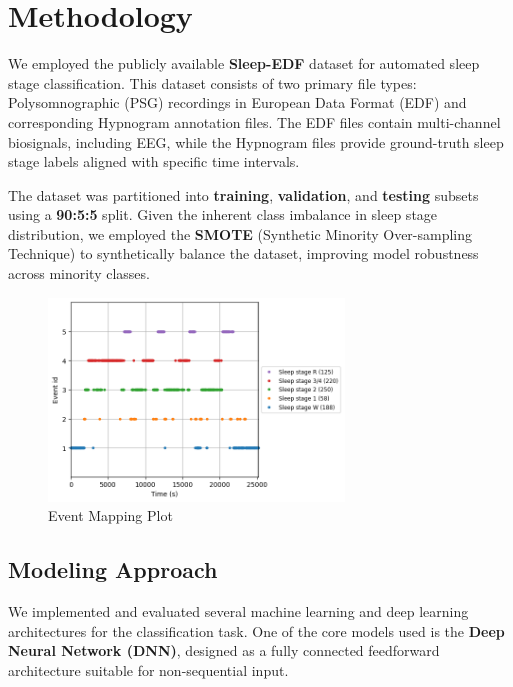 
\section{Methodology}



We employed the publicly available \textbf{Sleep-EDF} dataset for automated sleep stage classification. This dataset consists of two primary file types: Polysomnographic (PSG) recordings in European Data Format (EDF) and corresponding Hypnogram annotation files. The EDF files contain multi-channel biosignals, including EEG, while the Hypnogram files provide ground-truth sleep stage labels aligned with specific time intervals.



The dataset was partitioned into \textbf{training}, \textbf{validation}, and \textbf{testing} subsets using a \textbf{90:5:5} split. Given the inherent class imbalance in sleep stage distribution, we employed the \textbf{SMOTE} (Synthetic Minority Over-sampling Technique) to synthetically balance the dataset, improving model robustness across minority classes.


\begin{figure}[H]
	\centering
	\includegraphics[width=0.70\textwidth]{img/paper_2/sleep event.PNG}
	\caption{Event Mapping Plot}
	\label{fig:lstm_accuracy}
\end{figure}


\subsection{Modeling Approach}

We implemented and evaluated several machine learning and deep learning architectures for the classification task. One of the core models used is the \textbf{Deep Neural Network (DNN)}, designed as a fully connected feedforward architecture suitable for non-sequential input.

